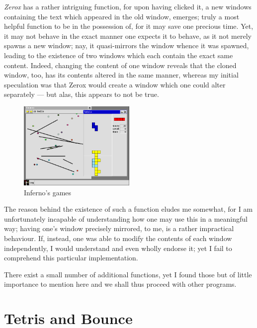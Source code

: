 \documentclass[a5paper,twoside,12pt]{report}
\begin{document}
  \textit{Zerox} has a rather intriguing function, for upon having clicked it, a new windows containing the text which appeared in the old window, emerges; truly a most helpful function to be in the possession of, for it may save one precious time. Yet, it may not behave in the exact manner one expects it to behave, as it not merely spawns a new window; nay, it quasi-mirrors the window whence it was spawned, leading to the existence of two windows which each contain the exact same content. Indeed, changing the content of one window reveals that the cloned window, too, has its contents altered in the same manner, whereas my initial speculation was that Zerox would create a window which one could alter separately — but alas, this appears to not be true.

  \begin{figure}
    \centering
    \includegraphics[width=0.5\textwidth]{imgs/games.png}
    \caption{Inferno's games}
  \end{figure}

  The reason behind the existence of such a function eludes me somewhat, for I am unfortunately incapable of understanding how one may use this in a meaningful way; having one's window precisely mirrored, to me, is a rather impractical behaviour. If, instead, one was able to modify the contents of each window independently, I would understand and even wholly endorse it; yet I fail to comprehend this particular implementation.

  There exist a small number of additional functions, yet I found those but of little importance to mention here and we shall thus proceed with other programs.

  \section*{Tetris and Bounce}
\end{document}
